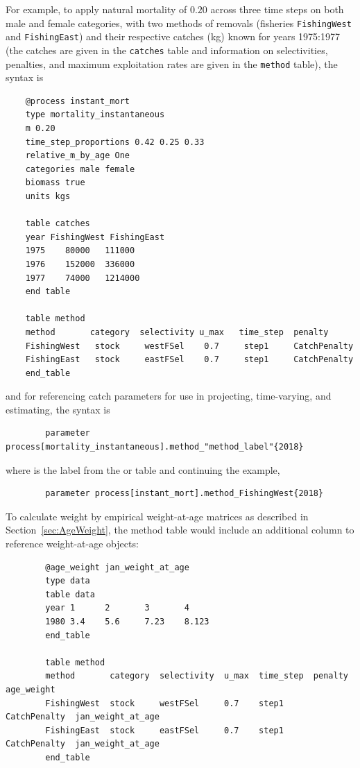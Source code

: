 For example, to apply natural mortality of $0.20$ across three time steps on both male and female categories, with two methods of removals (fisheries \texttt{FishingWest} and \texttt{FishingEast}) and their respective catches (kg) known for years 1975:1977 (the catches are given in the \texttt{catches} table and information on selectivities, penalties, and maximum exploitation rates are given in the \texttt{method} table), the syntax is


{\small{\begin{verbatim}
	@process instant_mort
	type mortality_instantaneous
	m 0.20
	time_step_proportions 0.42 0.25 0.33
	relative_m_by_age One
	categories male female
	biomass true
	units kgs

	table catches
	year FishingWest FishingEast
	1975	80000	111000
	1976	152000	336000
	1977	74000	1214000
	end table

	table method
	method       category  selectivity u_max   time_step  penalty
	FishingWest   stock     westFSel    0.7     step1     CatchPenalty
	FishingEast   stock     eastFSel    0.7     step1     CatchPenalty
	end_table
	\end{verbatim}}}

and for referencing catch parameters for use in projecting, time-varying, and estimating, the syntax is

{\small{\begin{verbatim}
		parameter process[mortality_instantaneous].method_"method_label"{2018}
\end{verbatim}}}

where  is the label from the  or  table and continuing the example,

{\small{\begin{verbatim}
		parameter process[instant_mort].method_FishingWest{2018}
\end{verbatim}}}

To calculate weight by empirical weight-at-age matrices as described in Section~\ref{sec:AgeWeight}, the method table would include an additional column to reference weight-at-age objects:

{\small{\begin{verbatim}
		@age_weight jan_weight_at_age
		type data
		table data
		year 1 		2 		3 		4
		1980 3.4	5.6		7.23 	8.123
		end_table

		table method
		method       category  selectivity  u_max  time_step  penalty       age_weight
		FishingWest  stock     westFSel     0.7    step1      CatchPenalty  jan_weight_at_age
		FishingEast  stock     eastFSel     0.7    step1      CatchPenalty  jan_weight_at_age
		end_table
\end{verbatim}}}



